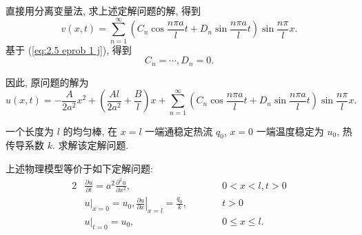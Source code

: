 \begin{exampleprob}
\begin{solution}
        直接用分离变量法, 求上述定解问题的解, 得到
        \begin{equation}
            v(x,t)=\sum_{n=1}^{\infty}\left(C_n\cos\frac{n\pi a}{l}t+D_n\sin\frac{n\pi a}{l}t\right)\sin\frac{n\pi}{l}x.
        \end{equation}
        基于 (\ref{eq:2.5 eprob 1 j}), 得到
        \begin{equation*}
            C_n=\cdots,D_n=0.
        \end{equation*}

        因此, 原问题的解为
        \begin{equation*}
            u(x,t)=-\frac{A}{2a^2}x^2+\left(\frac{Al}{2a^2}+\frac{B}{l}\right)x+\sum_{n=1}^{\infty}\left(C_n\cos\frac{n\pi a}{l}t+D_n\sin\frac{n\pi a}{l}t\right)\sin\frac{n\pi}{l}x.
        \end{equation*}
    \end{solution}
\end{exampleprob}

\begin{exampleprob}
    一个长度为 $l$ 的均匀棒, 在 $x=l$ 一端通稳定热流 $q_0$, $x=0$ 一端温度稳定为 $u_0$, 热传导系数 $k$. 求解该定解问题.

    \begin{solution}
        上述物理模型等价于如下定解问题:
        \begin{alignat}{2}
             & \frac{\partial u}{\partial t}=a^2\frac{\partial^2 u}{\partial x^2},          &  & \qquad 0<x<l,t>0      \\
             & u|_{x=0}=u_0,\left.\frac{\partial u}{\partial x}\right|_{x=l}=\frac{q_0}{k}, &  & \qquad t>0            \\
             & u|_{t=0}=u_0,                                                                &  & \qquad 0\leq x\leq l.
        \end{alignat}
    \end{solution}
\end{exampleprob}
